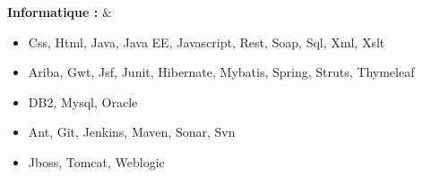 \textbf{Informatique :}
& \begin{itemize}
	\item Css, Html, Java, Java EE, Javascript, Rest, Soap, Sql, Xml, Xslt
    \item Ariba, Gwt, Jsf, Junit, Hibernate, Mybatis, Spring, Struts, Thymeleaf
    \item DB2, Mysql, Oracle
    \item Ant, Git, Jenkins, Maven, Sonar, Svn 
    \item Jboss, Tomcat, Weblogic
\end{itemize} \\
